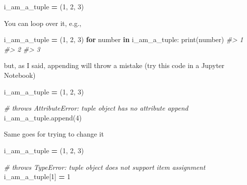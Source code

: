 \documentclass[
]{book}
\newenvironment{Shaded}{\begin{snugshade}}{\end{snugshade}}
\newcommand{\BuiltInTok}[1]{#1}
\newcommand{\CommentTok}[1]{\textcolor[rgb]{0.56,0.35,0.01}{\textit{#1}}}
\newcommand{\ControlFlowTok}[1]{\textcolor[rgb]{0.13,0.29,0.53}{\textbf{#1}}}
\newcommand{\DecValTok}[1]{\textcolor[rgb]{0.00,0.00,0.81}{#1}}
\newcommand{\KeywordTok}[1]{\textcolor[rgb]{0.13,0.29,0.53}{\textbf{#1}}}
\newcommand{\NormalTok}[1]{#1}
\newcommand{\OperatorTok}[1]{\textcolor[rgb]{0.81,0.36,0.00}{\textbf{#1}}}
\begin{document}
\begin{Shaded}
\begin{Highlighting}[]
\NormalTok{i\_am\_a\_tuple }\OperatorTok{=}\NormalTok{ (}\DecValTok{1}\NormalTok{, }\DecValTok{2}\NormalTok{, }\DecValTok{3}\NormalTok{)}
\end{Highlighting}
\end{Shaded}

You can loop over it, e.g.,

\begin{Shaded}
\begin{Highlighting}[]
\NormalTok{i\_am\_a\_tuple }\OperatorTok{=}\NormalTok{ (}\DecValTok{1}\NormalTok{, }\DecValTok{2}\NormalTok{, }\DecValTok{3}\NormalTok{)}
\ControlFlowTok{for}\NormalTok{ number }\KeywordTok{in}\NormalTok{ i\_am\_a\_tuple:}
    \BuiltInTok{print}\NormalTok{(number)}
\CommentTok{\#\textgreater{} 1}
\CommentTok{\#\textgreater{} 2}
\CommentTok{\#\textgreater{} 3}
\end{Highlighting}
\end{Shaded}

but, as I said, appending will throw a mistake (try this code in a Jupyter Notebook)

\begin{Shaded}
\begin{Highlighting}[]
\NormalTok{i\_am\_a\_tuple }\OperatorTok{=}\NormalTok{ (}\DecValTok{1}\NormalTok{, }\DecValTok{2}\NormalTok{, }\DecValTok{3}\NormalTok{)}

\CommentTok{\# throws AttributeError: \textquotesingle{}tuple\textquotesingle{} object has no attribute \textquotesingle{}append\textquotesingle{}}
\NormalTok{i\_am\_a\_tuple.append(}\DecValTok{4}\NormalTok{)}
\end{Highlighting}
\end{Shaded}

Same goes for trying to change it

\begin{Shaded}
\begin{Highlighting}[]
\NormalTok{i\_am\_a\_tuple }\OperatorTok{=}\NormalTok{ (}\DecValTok{1}\NormalTok{, }\DecValTok{2}\NormalTok{, }\DecValTok{3}\NormalTok{)}

\CommentTok{\# throws TypeError: \textquotesingle{}tuple\textquotesingle{} object does not support item assignment}
\NormalTok{i\_am\_a\_tuple[}\DecValTok{1}\NormalTok{] }\OperatorTok{=} \DecValTok{1} 
\end{Highlighting}
\end{Shaded}
\end{document}
